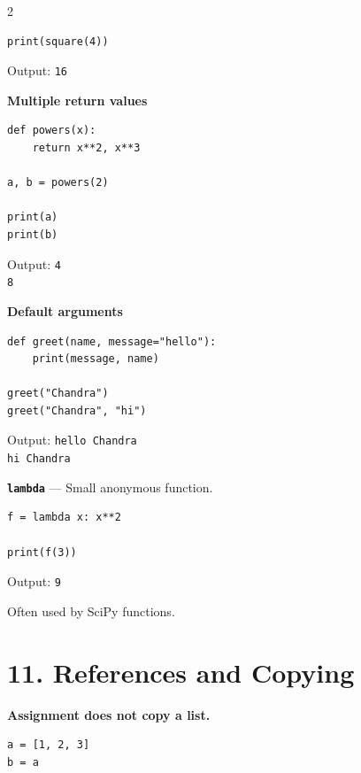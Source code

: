 \documentclass[10pt,a4paper]{article}
\begin{document}
\begin{multicols}{2}
\begin{card}
\begin{lstlisting}[style=pythonstyle]
print(square(4))
\end{lstlisting}

Output: \texttt{16}
\end{card}

\begin{card}
\textbf{Multiple return values}

\begin{lstlisting}[style=pythonstyle]
def powers(x):
    return x**2, x**3

a, b = powers(2)

print(a)
print(b)
\end{lstlisting}

Output:
\texttt{4}\\
\texttt{8}
\end{card}

\begin{card}
\textbf{Default arguments}

\begin{lstlisting}[style=pythonstyle]
def greet(name, message="hello"):
    print(message, name)

greet("Chandra")
greet("Chandra", "hi")
\end{lstlisting}

Output:
\texttt{hello Chandra}\\
\texttt{hi Chandra}
\end{card}

\begin{card}
\textbf{\texttt{lambda}} --- Small anonymous function.

\begin{lstlisting}[style=pythonstyle]
f = lambda x: x**2

print(f(3))
\end{lstlisting}

Output: \texttt{9}

Often used by SciPy functions.
\end{card}

\section*{11. References and Copying}

\begin{card}
\textbf{Assignment does not copy a list.}

\begin{lstlisting}[style=pythonstyle]
a = [1, 2, 3]
b = a


\end{lstlisting}
\end{card}
\end{multicols}
\end{document}
